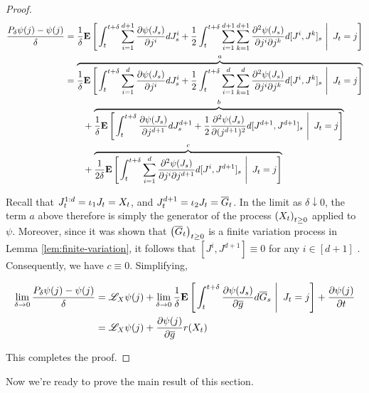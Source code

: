 \begin{proof}
  {\small %
  \begin{align*}
    \small
    \frac{P_\delta\psi(j) - \psi(j)}{\delta}
    &= \frac{1}{\delta}\ConditionExpect{\int_t^{t+\delta}\sum_{i=1}^{d+1}\partialderiv{\psi(J_s)}{j^i}dJ_s^i
      +
      \frac{1}{2}\int_t^{t+\delta}\sum_{i=1}^{d+1}\sum_{k=1}^{d+1}\frac{\partial^2\psi(J_s)}{\partial
      j^i\partial j^k}d[J^i, J^k]_s}{J_t=j}\\
    &= \overbrace{\frac{1}{\delta}\ConditionExpect{\int_t^{t+\delta}\sum_{i=1}^{d}\partialderiv{\psi(J_s)}{j^i}dJ_s^i
      +
      \frac{1}{2}\int_t^{t+\delta}\sum_{i=1}^{d}\sum_{k=1}^{d}\frac{\partial^2\psi(J_s)}{\partial
      j^i\partial j^k}d[J^i, J^k]_s}{J_t=j}}^a\\
    &\qquad+
      \overbrace{\frac{1}{\delta}\ConditionExpect{\int_t^{t+\delta}\partialderiv{\psi(J_s)}{j^{d+1}}dJ^{d+1}_s
      + \frac{1}{2}\frac{\partial^2\psi(J_s)}{\partial (j^{d+1})^2}d[J^{d+1},J^{d+1}]_s}{J_t=j}}^b\\
    &\qquad+
      \overbrace{\frac{1}{2\delta}\ConditionExpect{\int_t^{t+\delta}\sum_{i=1}^d\frac{\partial^2\psi(J_s)}{\partial
      j^i\partial j^{d+1}}d[J^i, J^{d+1}]_s}{J_t=j}}^c
  \end{align*}
  }

  Recall that $J^{1:d}_t = \proj{1}J_t = X_t$, and $J^{d+1}_t =
  \proj{2}J_t = \overline{G}_t$. In the limit as $\delta\downarrow 0$,
  the term $a$ above therefore is
  simply the generator of the process $\indexedabove{t}{X}$ applied to
  $\psi$. Moreover, since it was shown that
  $\indexedabove{t}{\overline{G}}$ is a finite variation process in
  Lemma \ref{lem:finite-variation}, it follows that $[J^i,
  J^{d+1}]\equiv 0$ for any $i\in [d+1]$
  \citep{le2016brownian}. Consequently, we have $c\equiv
  0$. Simplifying,

  \begin{align*}
    \lim_{\delta\to 0}\frac{P_\delta\psi(j) - \psi(j)}{\delta}
    &= \mathscr{L}_X\psi(j) + \lim_{\delta\to
      0} \frac{1}{\delta}\ConditionExpect{ \int_t^{t+\delta}
      \partialderiv{\psi(J_s)}{\overline{g}}d\overline{G}_s}{J_t =
      j} + \partialderiv{\psi( j)}{t}\\
    &= \mathscr{L}_X\psi(j) +
      \partialderiv{\psi(j)}{\overline{g}}r(X_t)
  \end{align*}

  This completes the proof.
\end{proof}

Now we're ready to prove the main result of this section.

